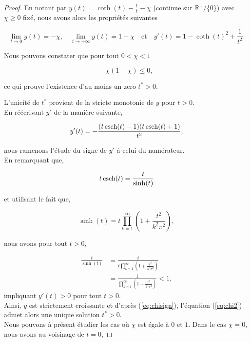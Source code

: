 \begin{proof}
En notant par $y(t) = \coth(t) - \frac{1}{t} - \chi$ (continue sur $\mathbb{R}^{+}/ \{0\}$) avec $\chi \geq 0$ fixé, nous avons alors les propriétés suivantes

$$\lim_{t\to 0} y(t) = -\chi, \quad \lim_{t\to +\infty} y(t) = 1 - \chi \quad \mbox{et} \quad   y'(t) = 1 - \coth(t)^2  + \frac{1}{t^2}. $$


Nous pouvons constater que pour tout $0 < \chi < 1$

\begin{equation}
\label{eq:chisign}
-\chi(1-\chi) \leq 0,
\end{equation}

ce qui prouve l'existence d'au moins un zero $t^* > 0$.

L'unicité de $t^*$ provient de la stricte monotonie de $y$ pour $t > 0$.\\
 
En réécrivant $y'$ de la manière suivante,

$$
y'(t) = -\frac{(t\operatorname{csch}(t) - 1)(t\operatorname{csch}(t) + 1)}{t^2},
$$

nous ramenons l'étude du signe de $y'$ à celui du numérateur.\\

En remarquant que,


$$
t\operatorname{csch}(t) = \frac{t}{\sinh(t)}
$$

et utilisant le fait que, 

\begin{equation}
\sinh(t) = t\prod_{k=1}^{\infty} ( 1 + \frac{t^2}{k^2\pi^2}),
\end{equation}

nous avons pour tout $t>0$,


\begin{equation}
\begin{aligned}
\frac{t}{\sinh(t)} &= \frac{t}{t\prod_{k=1}^{\infty} 
( 1 + \frac{t^2}{k^2\pi^2})}\\
&= \frac{1}{\prod_{k=1}^{\infty}( 1 + \frac{t^2}{k^2\pi^2})} < 1,
\end{aligned}
\end{equation}
impliquant $y'(t) > 0$ pour tout $t>0$.\\



Ainsi, $y$ est strictement croissante et d'après (\ref{eq:chisign}), l'équation (\ref{eq:chi2}) admet alors une unique solution $t^*>0$.\\

Nous pouvons à présent étudier les cas où $\chi$ est égale à $0$ et $1$. Dans le cas $\chi=0$, nous avons au voisinage de $t=0$,


\end{proof}
